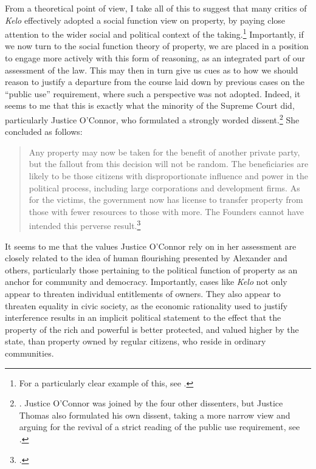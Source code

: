 From a theoretical point of view, I take all of this to suggest that many critics of {\it Kelo} effectively adopted a social function view on property, by paying close attention to the wider social and political context of the taking.\footnote{For a particularly clear example of this, see \cite{underkuffler06}.} Importantly, if we now turn to the social function theory of property, we are placed in a position to engage more actively with this form of reasoning, as an integrated part of our assessment of the law. This may then in turn give us cues as to how we should reason to justify a departure from the course laid down by previous cases on the ``public use'' requirement, where such a perspective was not adopted. Indeed, it seems to me that this is exactly what the minority of the Supreme Court did, particularly Justice O'Connor, who formulated a strongly worded dissent.\footnote{\cite[494-505]{kelo05}. Justice O'Connor was joined by the four other dissenters, but Justice Thomas also formulated his own dissent, taking a more narrow view and arguing for the revival of a strict reading of the public use requirement, see \cite[505-523]{kelo05}.} She concluded as follows:

\begin{quote}
Any property may now be taken for the benefit of another private party, but the fallout from this decision will not be random. The beneficiaries are likely to be those citizens with disproportionate influence and power in the political process, including large corporations and development firms. As for the victims, the government now has license to transfer property from those with fewer resources to those with more. The Founders cannot have intended this perverse result.\footcite[505]{kelo05}
\end{quote}

It seems to me that the values Justice O'Connor rely on in her assessment are closely related to the idea of human flourishing presented by Alexander and others, particularly those pertaining to the political function of property as an anchor for community and democracy. Importantly, cases like {\it Kelo} not only appear to threaten individual entitlements of owners. They also appear to threaten equality in civic society, as the economic rationality used to justify interference results in an implicit political statement to the effect that the property of the rich and powerful is better protected, and valued higher by the state, than property owned by regular citizens, who reside in ordinary communities.

